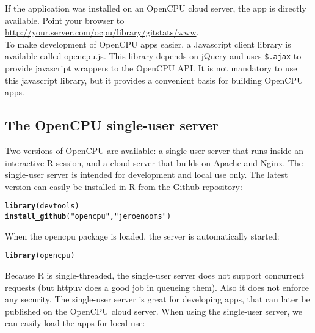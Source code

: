 \documentclass{scrartcl}\usepackage[]{graphicx}\usepackage[]{color}
\makeatletter
\newcommand{\hlstr}[1]{\textcolor[rgb]{0.192,0.494,0.8}{#1}}%
\newcommand{\hlstd}[1]{\textcolor[rgb]{0.345,0.345,0.345}{#1}}%
\newcommand{\hlkwd}[1]{\textcolor[rgb]{0.737,0.353,0.396}{\textbf{#1}}}%
\newenvironment{kframe}{%
 \def\at@end@of@kframe{}%
 \ifinner\ifhmode%
  \def\at@end@of@kframe{\end{minipage}}%
  \begin{minipage}{\columnwidth}%
 \fi\fi%
 \def\FrameCommand##1{\hskip\@totalleftmargin \hskip-\fboxsep
 \colorbox{shadecolor}{##1}\hskip-\fboxsep
     \hskip-\linewidth \hskip-\@totalleftmargin \hskip\columnwidth}%
 \MakeFramed {\advance\hsize-\width
   \@totalleftmargin\z@ \linewidth\hsize
   \@setminipage}}%
 {\par\unskip\endMakeFramed%
 \at@end@of@kframe}
\newenvironment{knitrout}{}{} %
\makeatother
\begin{document}
\noindent If the application was installed on an OpenCPU cloud server, the app is directly available. Point your browser to \href{http://your.server.com/ocpu/library/gitstats/www}{http://your.server.com/ocpu/library/gitstats/www}. \\

\noindent To make development of OpenCPU apps easier, a Javascript client library is available called \href{https://github.com/jeroenooms/opencpu.js}{opencpu.js}. This library depends on jQuery and uses \texttt{\$.ajax} to provide javascript wrappers to the OpenCPU API. It is not mandatory to use this javascript library, but it provides a convenient basis for building OpenCPU apps.

\subsection{The OpenCPU single-user server}

Two versions of OpenCPU are available: a single-user server that runs inside an interactive R session, and a cloud server that builds on Apache and Nginx. The single-user server is intended for development and local use only. The latest version can easily be installed in R from the Github repository:

\begin{knitrout}
\color{fgcolor}\begin{kframe}
\begin{alltt}
\hlkwd{library}\hlstd{(devtools)}
\hlkwd{install_github}\hlstd{(}\hlstr{"opencpu"}\hlstd{,} \hlstr{"jeroenooms"}\hlstd{)}
\end{alltt}
\end{kframe}
\end{knitrout}


\noindent When the opencpu package is loaded, the server is automatically started:
\begin{knitrout}
\color{fgcolor}\begin{kframe}
\begin{alltt}
\hlkwd{library}\hlstd{(opencpu)}
\end{alltt}
\end{kframe}
\end{knitrout}


\noindent Because R is single-threaded, the single-user server does not support concurrent requests (but httpuv does a good job in queueing them). Also it does not enforce any security. The single-user server is great for developing apps, that can later be published on the OpenCPU cloud server. When using the single-user server, we can easily load the apps for local use:
\end{document}
